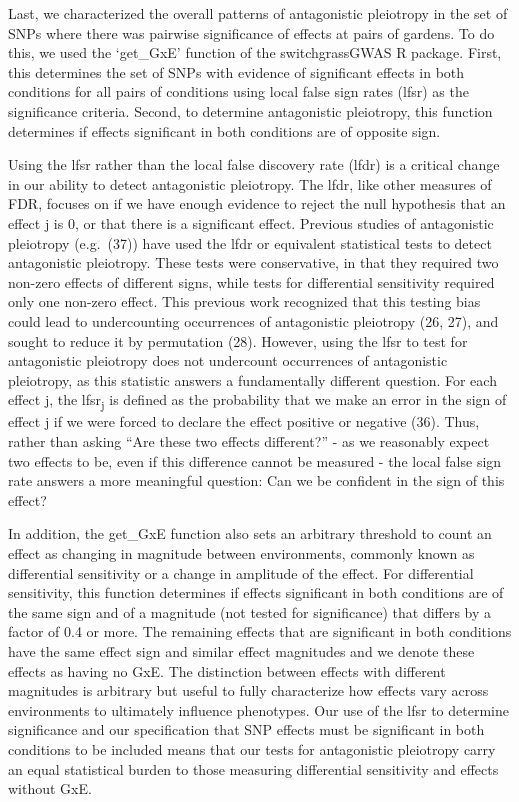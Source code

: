 \documentclass[
  9pt,
  twocolumn,
  twoside]{pnas-new}
\begin{document}
Last, we characterized the overall patterns of antagonistic pleiotropy
in the set of SNPs where there was pairwise significance of effects at
pairs of gardens. To do this, we used the `get\_GxE' function of the
switchgrassGWAS R package. First, this determines the set of SNPs with
evidence of significant effects in both conditions for all pairs of
conditions using local false sign rates (lfsr) as the significance
criteria. Second, to determine antagonistic pleiotropy, this function
determines if effects significant in both conditions are of opposite
sign.

Using the lfsr rather than the local false discovery rate (lfdr) is a
critical change in our ability to detect antagonistic pleiotropy. The
lfdr, like other measures of FDR, focuses on if we have enough evidence
to reject the null hypothesis that an effect j is 0, or that there is a
significant effect. Previous studies of antagonistic pleiotropy
(e.g.~(37)) have used the lfdr or equivalent statistical tests to detect
antagonistic pleiotropy. These tests were conservative, in that they
required two non-zero effects of different signs, while tests for
differential sensitivity required only one non-zero effect. This
previous work recognized that this testing bias could lead to
undercounting occurrences of antagonistic pleiotropy (26, 27), and
sought to reduce it by permutation (28). However, using the lfsr to test
for antagonistic pleiotropy does not undercount occurrences of
antagonistic pleiotropy, as this statistic answers a fundamentally
different question. For each effect j, the lfsr\textsubscript{j} is
defined as the probability that we make an error in the sign of effect j
if we were forced to declare the effect positive or negative (36). Thus,
rather than asking ``Are these two effects different?'' - as we
reasonably expect two effects to be, even if this difference cannot be
measured - the local false sign rate answers a more meaningful question:
Can we be confident in the sign of this effect?

In addition, the get\_GxE function also sets an arbitrary threshold to
count an effect as changing in magnitude between environments, commonly
known as differential sensitivity or a change in amplitude of the
effect. For differential sensitivity, this function determines if
effects significant in both conditions are of the same sign and of a
magnitude (not tested for significance) that differs by a factor of 0.4
or more. The remaining effects that are significant in both conditions
have the same effect sign and similar effect magnitudes and we denote
these effects as having no GxE. The distinction between effects with
different magnitudes is arbitrary but useful to fully characterize how
effects vary across environments to ultimately influence phenotypes. Our
use of the lfsr to determine significance and our specification that SNP
effects must be significant in both conditions to be included means that
our tests for antagonistic pleiotropy carry an equal statistical burden
to those measuring differential sensitivity and effects without GxE.
\end{document}
